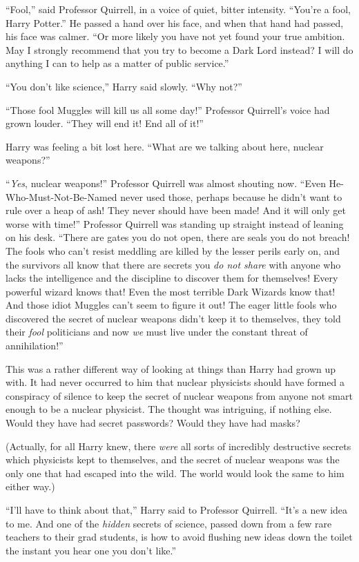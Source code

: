 “Fool,” said Professor Quirrell, in a voice of quiet, bitter intensity. “You’re a fool, Harry Potter.” He passed a hand over his face, and when that hand had passed, his face was calmer. “Or more likely you have not yet found your true ambition. May I strongly recommend that you try to become a Dark Lord instead? I will do anything I can to help as a matter of public service.”

“You don’t like science,” Harry said slowly. “Why not?”

“Those fool Muggles will kill us all some day!” Professor Quirrell’s voice had grown louder. “They will end it! End all of it!”

Harry was feeling a bit lost here. “What are we talking about here, nuclear weapons?”

“\emph{Yes}, nuclear weapons!” Professor Quirrell was almost shouting now. “Even He-Who-Must-Not-Be-Named never used those, perhaps because he didn’t want to rule over a heap of ash! They never should have been made! And it will only get worse with time!” Professor Quirrell was standing up straight instead of leaning on his desk. “There are gates you do not open, there are seals you do not breach! The fools who can’t resist meddling are killed by the lesser perils early on, and the survivors all know that there are secrets you \emph{do not share} with anyone who lacks the intelligence and the discipline to discover them for themselves! Every powerful wizard knows that! Even the most terrible Dark Wizards know that! And those idiot Muggles can’t seem to figure it out! The eager little fools who discovered the secret of nuclear weapons didn’t keep it to themselves, they told their \emph{fool} politicians and now \emph{we} must live under the constant threat of annihilation!”

This was a rather different way of looking at things than Harry had grown up with. It had never occurred to him that nuclear physicists should have formed a conspiracy of silence to keep the secret of nuclear weapons from anyone not smart enough to be a nuclear physicist. The thought was intriguing, if nothing else. Would they have had secret passwords? Would they have had masks?

(Actually, for all Harry knew, there \emph{were} all sorts of incredibly destructive secrets which physicists kept to themselves, and the secret of nuclear weapons was the only one that had escaped into the wild. The world would look the same to him either way.)

“I’ll have to think about that,” Harry said to Professor Quirrell. “It’s a new idea to me. And one of the \emph{hidden} secrets of science, passed down from a few rare teachers to their grad students, is how to avoid flushing new ideas down the toilet the instant you hear one you don’t like.”

